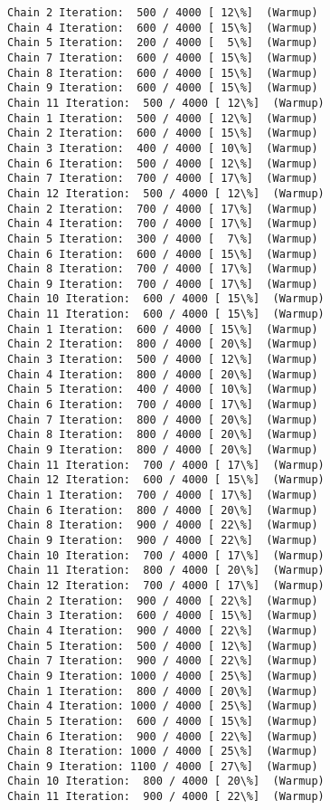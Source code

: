 \documentclass[11pt]{article}
\begin{document}
\begin{Verbatim}[commandchars=\\\{\}]
Chain 2 Iteration:  500 / 4000 [ 12\%]  (Warmup)
Chain 4 Iteration:  600 / 4000 [ 15\%]  (Warmup)
Chain 5 Iteration:  200 / 4000 [  5\%]  (Warmup)
Chain 7 Iteration:  600 / 4000 [ 15\%]  (Warmup)
Chain 8 Iteration:  600 / 4000 [ 15\%]  (Warmup)
Chain 9 Iteration:  600 / 4000 [ 15\%]  (Warmup)
Chain 11 Iteration:  500 / 4000 [ 12\%]  (Warmup)
Chain 1 Iteration:  500 / 4000 [ 12\%]  (Warmup)
Chain 2 Iteration:  600 / 4000 [ 15\%]  (Warmup)
Chain 3 Iteration:  400 / 4000 [ 10\%]  (Warmup)
Chain 6 Iteration:  500 / 4000 [ 12\%]  (Warmup)
Chain 7 Iteration:  700 / 4000 [ 17\%]  (Warmup)
Chain 12 Iteration:  500 / 4000 [ 12\%]  (Warmup)
Chain 2 Iteration:  700 / 4000 [ 17\%]  (Warmup)
Chain 4 Iteration:  700 / 4000 [ 17\%]  (Warmup)
Chain 5 Iteration:  300 / 4000 [  7\%]  (Warmup)
Chain 6 Iteration:  600 / 4000 [ 15\%]  (Warmup)
Chain 8 Iteration:  700 / 4000 [ 17\%]  (Warmup)
Chain 9 Iteration:  700 / 4000 [ 17\%]  (Warmup)
Chain 10 Iteration:  600 / 4000 [ 15\%]  (Warmup)
Chain 11 Iteration:  600 / 4000 [ 15\%]  (Warmup)
Chain 1 Iteration:  600 / 4000 [ 15\%]  (Warmup)
Chain 2 Iteration:  800 / 4000 [ 20\%]  (Warmup)
Chain 3 Iteration:  500 / 4000 [ 12\%]  (Warmup)
Chain 4 Iteration:  800 / 4000 [ 20\%]  (Warmup)
Chain 5 Iteration:  400 / 4000 [ 10\%]  (Warmup)
Chain 6 Iteration:  700 / 4000 [ 17\%]  (Warmup)
Chain 7 Iteration:  800 / 4000 [ 20\%]  (Warmup)
Chain 8 Iteration:  800 / 4000 [ 20\%]  (Warmup)
Chain 9 Iteration:  800 / 4000 [ 20\%]  (Warmup)
Chain 11 Iteration:  700 / 4000 [ 17\%]  (Warmup)
Chain 12 Iteration:  600 / 4000 [ 15\%]  (Warmup)
Chain 1 Iteration:  700 / 4000 [ 17\%]  (Warmup)
Chain 6 Iteration:  800 / 4000 [ 20\%]  (Warmup)
Chain 8 Iteration:  900 / 4000 [ 22\%]  (Warmup)
Chain 9 Iteration:  900 / 4000 [ 22\%]  (Warmup)
Chain 10 Iteration:  700 / 4000 [ 17\%]  (Warmup)
Chain 11 Iteration:  800 / 4000 [ 20\%]  (Warmup)
Chain 12 Iteration:  700 / 4000 [ 17\%]  (Warmup)
Chain 2 Iteration:  900 / 4000 [ 22\%]  (Warmup)
Chain 3 Iteration:  600 / 4000 [ 15\%]  (Warmup)
Chain 4 Iteration:  900 / 4000 [ 22\%]  (Warmup)
Chain 5 Iteration:  500 / 4000 [ 12\%]  (Warmup)
Chain 7 Iteration:  900 / 4000 [ 22\%]  (Warmup)
Chain 9 Iteration: 1000 / 4000 [ 25\%]  (Warmup)
Chain 1 Iteration:  800 / 4000 [ 20\%]  (Warmup)
Chain 4 Iteration: 1000 / 4000 [ 25\%]  (Warmup)
Chain 5 Iteration:  600 / 4000 [ 15\%]  (Warmup)
Chain 6 Iteration:  900 / 4000 [ 22\%]  (Warmup)
Chain 8 Iteration: 1000 / 4000 [ 25\%]  (Warmup)
Chain 9 Iteration: 1100 / 4000 [ 27\%]  (Warmup)
Chain 10 Iteration:  800 / 4000 [ 20\%]  (Warmup)
Chain 11 Iteration:  900 / 4000 [ 22\%]  (Warmup)

\end{Verbatim}
\end{document}
